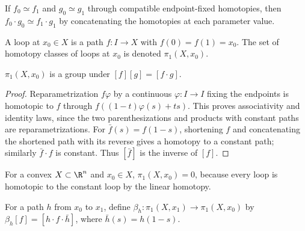 If $f_0\simeq f_1$ and $g_0\simeq g_1$ through compatible endpoint-fixed
homotopies, then $f_0\cdot g_0\simeq f_1\cdot g_1$ by concatenating the
homotopies at each parameter value.

\begin{definition}
\label{def:loop-and-pi1-set}
\leanok
{}
A loop at $x_0\in X$ is a path $f:I\to X$ with $f(0)=f(1)=x_0$. The set of
homotopy classes of loops at $x_0$ is denoted $\pi_1(X,x_0)$.
\end{definition}

\begin{proposition}[$\pi_1(X,x_0)$ is a group]
\label{prop:pi1-is-a-group}
\leanok
{}
$\pi_1(X,x_0)$ is a group under $[f][g]=[f\cdot g]$.
\end{proposition}

\begin{proof}
\leanok
\sketch Reparametrization $f\varphi$ by a continuous $\varphi:I\to I$ fixing
the endpoints is homotopic to $f$ through
$f((1-t)\varphi(s)+ts)$. This proves associativity and identity laws, since
the two parenthesizations and products with constant paths are
reparametrizations. For $\bar f(s)=f(1-s)$, shortening $f$ and concatenating
the shortened path with its reverse gives a homotopy to a constant path;
similarly $\bar f\cdot f$ is constant. Thus $[\bar f]$ is the inverse of
$[f]$.
\end{proof}

\begin{example}
\label{ex:convex-set-trivial-pi1}
\leanok
{}
For a convex $X\subset\R^n$ and $x_0\in X$, $\pi_1(X,x_0)=0$, because every
loop is homotopic to the constant loop by the linear homotopy.
\end{example}

\begin{definition}
\label{def:change-of-basepoint-map}
\leanok
{}
For a path $h$ from $x_0$ to $x_1$, define
$\beta_h:\pi_1(X,x_1)\to\pi_1(X,x_0)$ by
$\beta_h[f]=[h\cdot f\cdot\bar h]$, where $\bar h(s)=h(1-s)$.
\end{definition}

